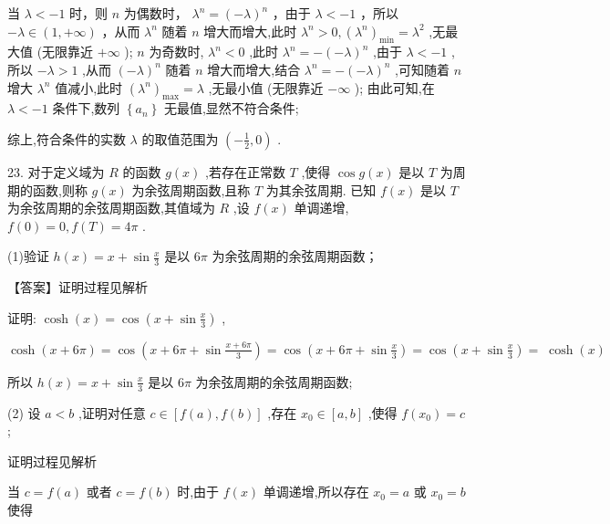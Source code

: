\documentclass[10pt]{article}
\newcommand*\circled[1]{\tikz[baseline=(char.base)]{\node[shape=circle,draw,inner sep=1.5pt] (char) {\small #1};}}
\begin{document}
 \circled{3}  当 \(\lambda  <  - 1\) 时，则 \(n\) 为偶数时， \({\lambda }^{n} = {\left( -\lambda \right) }^{n}\) ，由于 \(\lambda  <  - 1\) ，所以 \(- \lambda  \in  \left( {1, + \infty }\right)\) ，从而 \({\lambda }^{n}\) 随着 \(n\) 增大而增大,此时 \({\lambda }^{n} > 0,{\left( {\lambda }^{n}\right) }_{\min } = {\lambda }^{2}\) ,无最大值 (无限靠近 \(+ \infty\) ); \(n\) 为奇数时, \({\lambda }^{n} < 0\) ,此时 \({\lambda }^{n} =  - {\left( -\lambda \right) }^{n}\) ,由于 \(\lambda  <  - 1\) ,所以 \(- \lambda  > 1\) ,从而 \({\left( -\lambda \right) }^{n}\) 随着 \(n\) 增大而增大,结合 \({\lambda }^{n} =  - {\left( -\lambda \right) }^{n}\) ,可知随着 \(n\) 增大 \({\lambda }^{n}\) 值减小,此时 \({\left( {\lambda }^{n}\right) }_{\max } = \lambda\) ,无最小值 (无限靠近 \(- \infty\) ); 由此可知,在 \(\lambda  <  - 1\) 条件下,数列 \(\left\{  {a}_{n}\right\}\) 无最值,显然不符合条件;

综上,符合条件的实数 \(\lambda\) 的取值范围为 \(\left( {-\frac{1}{2},0}\right)\) .

23. 对于定义域为 \(R\) 的函数 \(g\left( x\right)\) ,若存在正常数 \(T\) ,使得 \(\cos g\left( x\right)\) 是以 \(T\) 为周期的函数,则称 \(g\left( x\right)\) 为余弦周期函数,且称 \(T\) 为其余弦周期. 已知 \(f\left( x\right)\) 是以 \(T\) 为余弦周期的余弦周期函数,其值域为 \(R\) ,设 \(f\left( x\right)\) 单调递增, \(f\left( 0\right)  = 0,f\left( T\right)  = {4\pi }\) .

(1)验证 \(h\left( x\right)  = x + \sin \frac{x}{3}\) 是以 \({6\pi }\) 为余弦周期的余弦周期函数；

【答案】证明过程见解析

证明: \(\cosh \left( x\right)  = \cos \left( {x + \sin \frac{x}{3}}\right)\) ,

\(\cosh \left( {x + {6\pi }}\right)  = \cos \left( {x + {6\pi } + \sin \frac{x + {6\pi }}{3}}\right)  = \cos \left( {x + {6\pi } + \sin \frac{x}{3}}\right)  = \cos \left( {x + \sin \frac{x}{3}}\right)  = \; \cosh \left( x\right)\)

所以 \(h\left( x\right)  = x + \sin \frac{x}{3}\) 是以 \({6\pi }\) 为余弦周期的余弦周期函数;

(2) 设 \(a < b\) ,证明对任意 \(c \in  \left\lbrack  {f\left( a\right) ,f\left( b\right) }\right\rbrack\) ,存在 \({x}_{0} \in  \left\lbrack  {a,b}\right\rbrack\) ,使得 \(f\left( {x}_{0}\right)  = c\) ;

证明过程见解析

当 \(c = f\left( a\right)\) 或者 \(c = f\left( b\right)\) 时,由于 \(f\left( x\right)\) 单调递增,所以存在 \({x}_{0} = a\) 或 \({x}_{0} = b\) 使得
\end{document}
